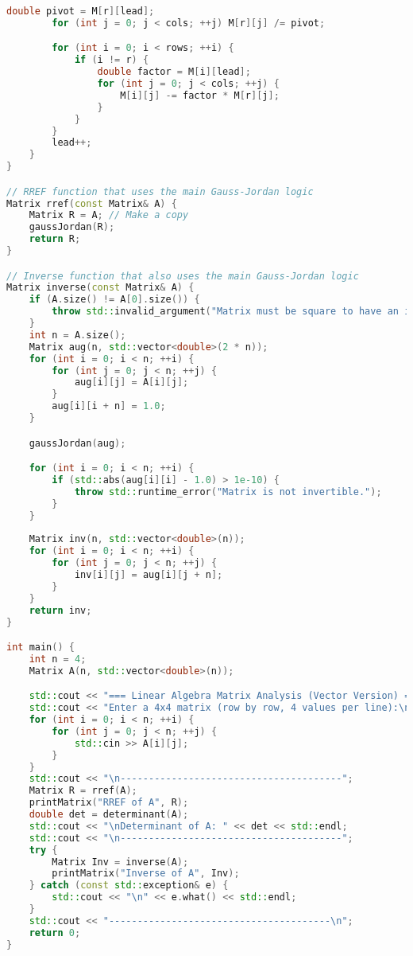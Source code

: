 \documentclass{article}
\begin{document}
\begin{lstlisting}[language=C++, caption={Modern C++ code for RREF, determinant, and inverse of a 4x4 matrix.}, label=lst:code, basicstyle=\footnotesize\ttfamily, breaklines=true]
        double pivot = M[r][lead];
        for (int j = 0; j < cols; ++j) M[r][j] /= pivot;

        for (int i = 0; i < rows; ++i) {
            if (i != r) {
                double factor = M[i][lead];
                for (int j = 0; j < cols; ++j) {
                    M[i][j] -= factor * M[r][j];
                }
            }
        }
        lead++;
    }
}

// RREF function that uses the main Gauss-Jordan logic
Matrix rref(const Matrix& A) {
    Matrix R = A; // Make a copy
    gaussJordan(R);
    return R;
}

// Inverse function that also uses the main Gauss-Jordan logic
Matrix inverse(const Matrix& A) {
    if (A.size() != A[0].size()) {
        throw std::invalid_argument("Matrix must be square to have an inverse.");
    }
    int n = A.size();
    Matrix aug(n, std::vector<double>(2 * n));
    for (int i = 0; i < n; ++i) {
        for (int j = 0; j < n; ++j) {
            aug[i][j] = A[i][j];
        }
        aug[i][i + n] = 1.0;
    }

    gaussJordan(aug);

    for (int i = 0; i < n; ++i) {
        if (std::abs(aug[i][i] - 1.0) > 1e-10) {
            throw std::runtime_error("Matrix is not invertible.");
        }
    }
    
    Matrix inv(n, std::vector<double>(n));
    for (int i = 0; i < n; ++i) {
        for (int j = 0; j < n; ++j) {
            inv[i][j] = aug[i][j + n];
        }
    }
    return inv;
}

int main() {
    int n = 4;
    Matrix A(n, std::vector<double>(n));

    std::cout << "=== Linear Algebra Matrix Analysis (Vector Version) ===\n";
    std::cout << "Enter a 4x4 matrix (row by row, 4 values per line):\n";
    for (int i = 0; i < n; ++i) {
        for (int j = 0; j < n; ++j) {
            std::cin >> A[i][j];
        }
    }
    std::cout << "\n---------------------------------------";
    Matrix R = rref(A);
    printMatrix("RREF of A", R);
    double det = determinant(A);
    std::cout << "\nDeterminant of A: " << det << std::endl;
    std::cout << "\n---------------------------------------";
    try {
        Matrix Inv = inverse(A);
        printMatrix("Inverse of A", Inv);
    } catch (const std::exception& e) {
        std::cout << "\n" << e.what() << std::endl;
    }
    std::cout << "---------------------------------------\n";
    return 0;
}
\end{lstlisting}
\end{document}
